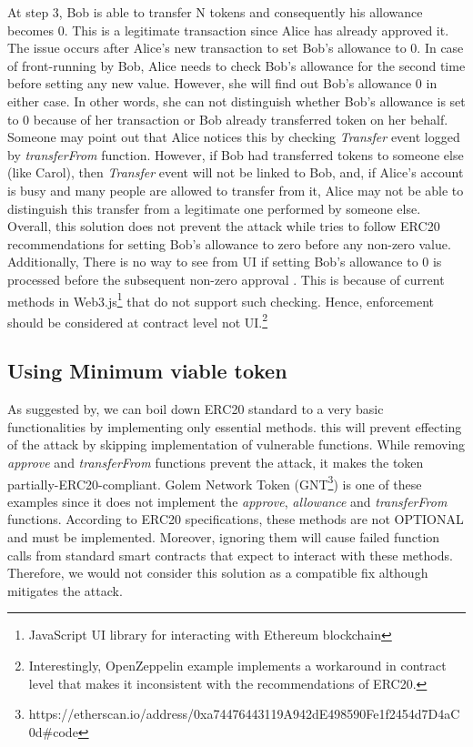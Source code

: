 At step 3, Bob is able to transfer N tokens and consequently his allowance becomes 0. This is a legitimate transaction since Alice has already approved it. The issue occurs after Alice’s new transaction to set Bob's allowance to 0. In case of front-running by Bob, Alice needs to check Bob’s allowance for the second time before setting any new value. However, she will find out Bob’s allowance 0 in either case. In other words, she can not distinguish whether Bob’s allowance is set to 0 because of her transaction or Bob already transferred token on her behalf. Someone may point out that Alice notices this by checking \textit{Transfer} event logged by \textit{transferFrom} function. However, if Bob had transferred tokens to someone else (like Carol), then \textit{Transfer} event will not be linked to Bob, and, if Alice’s account is busy and many people are allowed to transfer from it, Alice may not be able to distinguish this transfer from a legitimate one performed by someone else. Overall, this solution does not prevent the attack while tries to follow ERC20 recommendations for setting Bob’s allowance to zero before any non-zero value. Additionally, There is no way to see from UI if setting Bob's allowance to 0 is processed before the subsequent non-zero approval \cite{Ref03}. This is because of current methods in Web3.js\footnote{JavaScript UI library for interacting with Ethereum blockchain} that do not support such checking\cite{Ref05}. Hence, enforcement should be considered at contract level not UI.\footnote{Interestingly, OpenZeppelin example implements a workaround in contract level that makes it inconsistent with the recommendations of ERC20.}

\subsection{Using Minimum viable token}
As suggested by\cite{Ref05}, we can boil down ERC20 standard to a very basic functionalities by implementing only essential methods. this will prevent effecting of the attack by skipping implementation of vulnerable functions. While removing \textit{approve} and \textit{transferFrom} functions prevent the attack, it makes the token partially-ERC20-compliant. Golem Network Token (GNT\footnote{https://etherscan.io/address/0xa74476443119A942dE498590Fe1f2454d7D4aC0d\#code}) is one of these examples since it does not implement the \textit{approve}, \textit{allowance} and \textit{transferFrom} functions. According to ERC20 specifications, these methods are not OPTIONAL and must be implemented. Moreover, ignoring them will cause failed function calls from standard smart contracts that expect to interact with these methods. Therefore, we would not consider this solution as a compatible fix although mitigates the attack.

